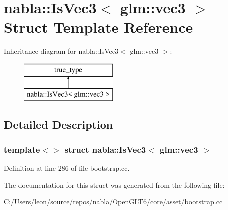 \hypertarget{structnabla_1_1_is_vec3_3_01glm_1_1vec3_01_4}{}\section{nabla\+::Is\+Vec3$<$ glm\+::vec3 $>$ Struct Template Reference}
\label{structnabla_1_1_is_vec3_3_01glm_1_1vec3_01_4}
Inheritance diagram for nabla\+::Is\+Vec3$<$ glm\+::vec3 $>$\+:\begin{figure}[H]
\begin{center}
\leavevmode
\includegraphics[height=2.000000cm]{structnabla_1_1_is_vec3_3_01glm_1_1vec3_01_4}
\end{center}
\end{figure}


\subsection{Detailed Description}
\subsubsection*{template$<$$>$\newline
struct nabla\+::\+Is\+Vec3$<$ glm\+::vec3 $>$}



Definition at line 286 of file bootstrap.\+cc.



The documentation for this struct was generated from the following file\+:\begin{DoxyCompactItemize}
\item 
C\+:/\+Users/leon/source/repos/nabla/\+Open\+G\+L\+T6/core/asset/bootstrap.\+cc\end{DoxyCompactItemize}
